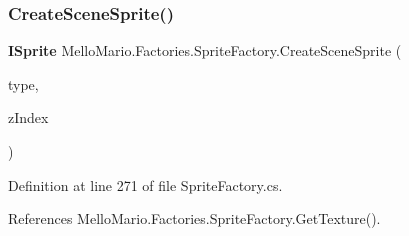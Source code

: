 \subsubsection{Create\+Scene\+Sprite()}
{\footnotesize\ttfamily \textbf{ I\+Sprite} Mello\+Mario.\+Factories.\+Sprite\+Factory.\+Create\+Scene\+Sprite (\begin{DoxyParamCaption}\item[{string}]{type,  }\item[{\textbf{ Z\+Index}}]{z\+Index }\end{DoxyParamCaption})}



Definition at line 271 of file Sprite\+Factory.\+cs.



References Mello\+Mario.\+Factories.\+Sprite\+Factory.\+Get\+Texture().


